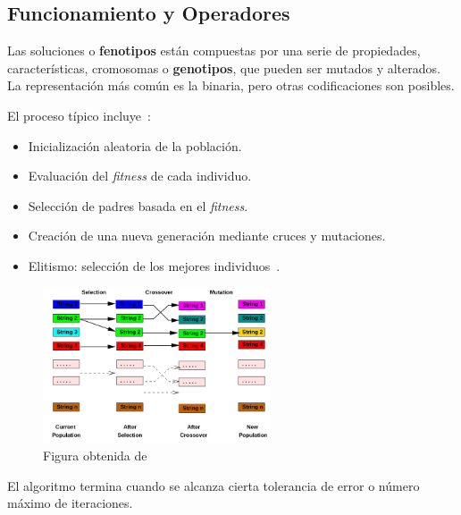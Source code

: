 \subsection{Funcionamiento y Operadores}
Las soluciones o \textbf{fenotipos} están compuestas por una serie de propiedades, características, cromosomas o \textbf{genotipos}, que pueden ser mutados y alterados. La representación más común es la binaria, pero otras codificaciones son posibles.

El proceso típico incluye~\cite{mathew2012genetic}:
\begin{itemize}
    \item Inicialización aleatoria de la población.
    \item Evaluación del \textit{fitness} de cada individuo.
    \item Selección de padres basada en el \textit{fitness}.
    \item Creación de una nueva generación mediante cruces y mutaciones.
    \item Elitismo: selección de los mejores individuos~\cite{mirjalili2019genetic}.
\end{itemize}

\begin{figure}[H]
    \begin{center}
        \includegraphics[width=0.6\textwidth]{imagenes/ga-working-principle.png}
    \end{center}
    \caption[Funcionamiento de un algoritmo genético]{Figura obtenida de \cite{mathew2012genetic}}
\end{figure}


El algoritmo termina cuando se alcanza cierta tolerancia de error o número máximo de iteraciones.

